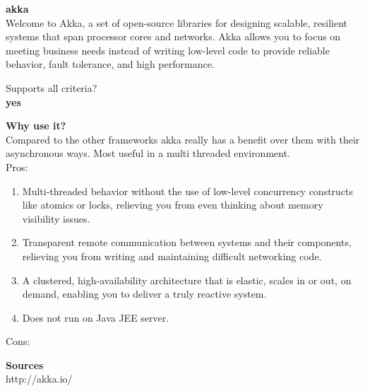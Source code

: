 
		\textbf{akka} \\
		Welcome to Akka, a set of open-source libraries for designing scalable, resilient systems that span processor cores and networks. Akka allows you to focus on meeting business needs instead of writing low-level code to provide reliable behavior, fault tolerance, and high performance.
		
		Supports all criteria?\\
		\textbf{yes}
		
	 	\textbf{Why use it?} \\
		Compared to the other frameworks akka really has a benefit over them with their asynchronous ways. Most useful in a multi threaded environment.\\
		
		
		Pros:
		\begin{enumerate}
			\item Multi-threaded behavior without the use of low-level concurrency constructs like atomics or locks, relieving you from even thinking about memory visibility issues.
			\item Transparent remote communication between systems and their components, relieving you from writing and maintaining difficult networking code.
			\item A clustered, high-availability architecture that is elastic, scales in or out, on demand, enabling you to deliver a truly reactive system.
			\item Does not run on Java JEE server.
		\end{enumerate}
		Cons:

	\textbf{Sources}\\
	http://akka.io/